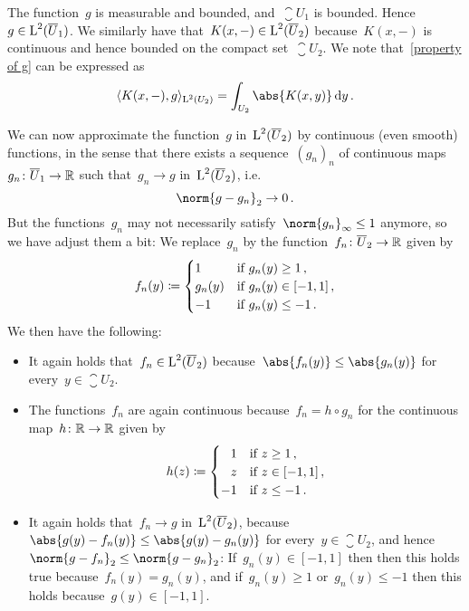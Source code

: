 The function~$g$ is measurable and bounded, and~$\closure{U}_1$ is bounded.
Hence~$g \in \operatorname{L}^2(\overline{U}_1)$.
We similarly have that~$K(x,-) \in \operatorname{L}^2(\overline{U}_2)$ because~$K(x,-)$ is continuous and hence bounded on the compact set~$\closure{U}_2$.
We note that~\eqref{property of g} can be expressed as
\[
    \bil{ K(x,-), g }_{\Lp^2(U_2)}
  = \int_{U_2} \abs{K(x,y)} \dd{y} \,.
\]

We can now approximate the function~$g$ in~$\operatorname{L}^2(\overline{U}_2)$ by continuous (even smooth) functions, in the sense that there exists a sequence~$(g_n)_n$ of continuous maps~$g_n \colon \overline{U}_1 \to \mathbb{R}$ such that~$g_n \to g$ in~$\operatorname{L}^2(\overline{U}_2)$, i.e.\
\[
  \norm{g - g_n}_2 \to 0 \,.
\]
But the functions~$g_n$ may not necessarily satisfy~$\norm{g_n}_\infty \leq 1$ anymore, so we have adjust them a bit:
We replace~$g_n$ by the function~$f_n \colon \overline{U}_2 \to \mathbb{R}$ given by
\[
            f_n(y)
  \coloneqq  \begin{cases}
              1       & \text{if~$g_n(y) \geq 1$} \,, \\
              g_n(y)  & \text{if~$g_n(y) \in [-1,1]$} \,, \\
              -1      & \text{if~$g_n(y) \leq -1$}  \,.
            \end{cases}
\]
We then have the following:
\begin{itemize}
  \item
    It again holds that~$f_n \in \operatorname{L}^2(\overline{U}_2)$ because~$\abs{f_n(y)} \leq \abs{g_n(y)}$ for every~$y \in \closure{U}_2$.
  \item
    The functions~$f_n$ are again continuous because~$f_n = h \circ g_n$ for the continuous map~$h \colon \mathbb{R} \to \mathbb{R}$ given by
    \[
                h(z)
      \coloneqq  \begin{cases}
                  \phantom{-}1  & \text{if~$z \geq 1$}  \,, \\
                  \phantom{-}z  & \text{if~$z \in [-1,1]$}  \,, \\
                            -1  & \text{if~$z \leq -1$} \,.
                \end{cases}
    \]
  \item
    It again holds that~$f_n \to g$ in~$\operatorname{L}^2(\overline{U}_2)$, because~$\abs{g(y) - f_n(y)} \leq \abs{g(y) - g_n(y)}$ for every~$y \in \closure{U}_2$, and hence~$\norm{g - f_n}_2 \leq \norm{g - g_n}_2$:
    If~$g_n(y) \in [-1,1]$ then then this holds true because~$f_n(y) = g_n(y)$, and if~$g_n(y) \geq 1$ or~$g_n(y) \leq -1$ then this holds because~$g(y) \in [-1,1]$.
\end{itemize}

